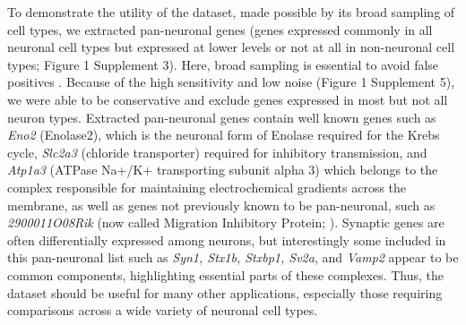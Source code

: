 To demonstrate the utility of the dataset, made possible by its broad sampling of cell types, we extracted pan-neuronal genes (genes expressed commonly in all neuronal cell types but expressed at lower levels or not at all in non-neuronal cell types; Figure 1 Supplement 3). Here, broad sampling is essential to avoid false positives \citep{Zhang_2014,Mo_2015,Stefanakis_2015}. Because of the high sensitivity and low noise (Figure 1 Supplement 5), we were able to be conservative and exclude genes expressed in most but not all neuron types. Extracted pan-neuronal genes contain well known genes such as \textit{Eno2} (Enolase2), which is the neuronal form of Enolase required for the Krebs cycle, \textit{Slc2a3} (chloride transporter) required for inhibitory transmission, and \textit{Atp1a3} (ATPase Na+/K+ transporting subunit alpha 3) which belongs to the complex responsible for maintaining electrochemical gradients across the membrane, as well as genes not previously known to be pan-neuronal, such as \textit{2900011O08Rik} (now called Migration Inhibitory Protein; \cite{Zhang_2014a}). Synaptic genes are often differentially expressed among neurons, but interestingly some included in this pan-neuronal list such as \textit{Syn1, Stx1b, Stxbp1, Sv2a}, and \textit{Vamp2} appear to be common components, highlighting essential parts of these complexes. Thus, the dataset should be useful for many other applications, especially those requiring comparisons across a wide variety of neuronal cell types. 

